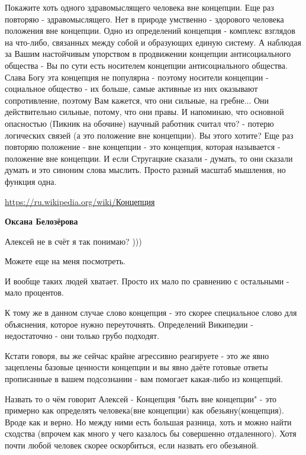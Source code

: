 \begin{itemize}
Покажите хоть одного здравомыслящего человека вне концепции. Еще раз повторяю -
здравомыслящего. Нет в природе умственно - здорового человека положения вне
концепции. Одно из определений концепция - комплекс взглядов на что-либо,
связанных между собой и образующих единую систему. А наблюдая за Вашим
настойчивым упорством в продвижении концепции антисоциального общества - Вы по
сути есть носителем концепции антисоциального общества. Слава Богу эта
концепция не популярна - поэтому носители концепции - социальное общество - их
больше, самые активные из них оказывают сопротивление, поэтому Вам кажется, что
они сильные, на гребне... Они действительно сильные, потому, что они правы. И
напоминаю, что основной опасностью (Пикник на обочине) научный работник считал
что? - потерю логических связей (а это положение вне концепции). Вы этого
хотите? Еще раз повторяю положение - вне концепции - это концепция, которая
называется - положение вне концепции. И если Стругацкие сказали - думать, то
они сказали думать и это синоним слова мыслить. Просто разный масштаб мышления,
но функция одна.

\url{https://ru.wikipedia.org/wiki/Концепция}

\begin{itemize}
 
\textbf{Оксана Белозёрова} 

Алексей не в счёт я так понимаю? )))

Можете еще на меня посмотреть.

И вообще таких людей хватает. Просто их мало по сравнению с остальными - мало
процентов.

К тому же в данном случае слово концепция - это скорее специальное слово для
объяснения, которое нужно переуточнять. Определений Википедии - недостаточно -
они только грубо подходят.

Кстати говоря, вы же сейчас крайне агрессивно реагируете - это же явно
зацеплены базовые ценности концепции и вы явно даёте готовые ответы прописанные
в вашем подсознании - вам помогает какая-либо из концепций.

Назвать то о чём говорит Алексей - Концепция "быть вне концепции" - это
примерно как определять человека(вне концепции) как обезьяну(концепция). Вроде
как и верно. Но между ними есть большая разница, хоть и можно найти сходства
(впрочем как много у чего казалось бы совершенно отдаленного). Хотя почти любой
человек скорее оскорбиться, если назвать его обезьяной.



\end{itemize}
\end{itemize}
